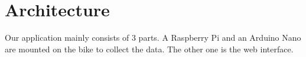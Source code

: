 \section{Architecture}
Our application mainly consists of 3 parts. A Raspberry Pi and an Arduino Nano are mounted on the bike to collect the data. The other one is the web interface.